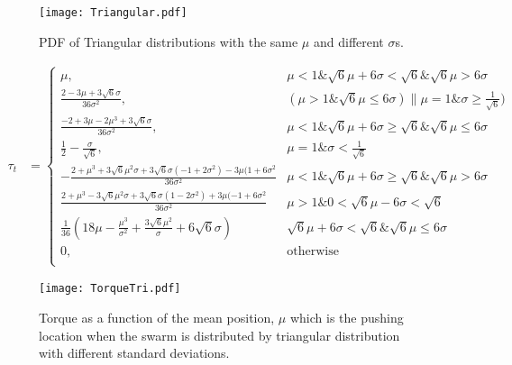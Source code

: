 \begin{figure}
\begin{center}
	\texttt{[image: Triangular.pdf]}
\end{center}
\vspace{-1em}
\caption{\label{fig:pdfTri}
PDF of Triangular distributions with the same $\mu$ and different $\sigma$s.
}
\vspace{-1em}
\end{figure}
\begin{align*}
\tau_t &=  \left\{
\begin{array}{ll}
    \mu, &  \mu<1 \& \sqrt{6} \mu + 6 \sigma < \sqrt{6} \& \sqrt{6} \mu > 6 \sigma\\
    \frac{2-3\mu+3\sqrt{6}\sigma}{36\sigma^2}, & (\mu>1\&\sqrt{6}\mu \leq 6\sigma) \| \mu =1 \& \sigma \geq \frac{1}{\sqrt{6}})\\
    \frac{-2+3\mu-2\mu^3+3\sqrt{6}\sigma}{36\sigma^2}, &  \mu<1 \& \sqrt{6}\mu+6\sigma\geq \sqrt{6} \& \sqrt{6} \mu \leq 6\sigma\\
    \frac{1}{2}-\frac{\sigma}{\sqrt{6}}, &   \mu = 1 \& \sigma < \frac{1}{\sqrt{6}}\\
    -\frac{2+\mu^3+3\sqrt{6}\mu^2\sigma+3\sqrt{6}\sigma(-1+2\sigma^2)-3\mu(1+6\sigma^2}{36\sigma^2} & \mu<1 \& \sqrt{6} \mu + 6 \sigma \geq \sqrt{6} \& \sqrt{6} \mu > 6 \sigma\\
    \frac{2+\mu^3-3\sqrt{6}\mu^2\sigma+3\sqrt{6}\sigma(1-2\sigma^2)+3\mu(-1+6\sigma^2}{36\sigma^2} & \mu>1 \& 0<\sqrt{6}\mu-6\sigma<\sqrt{6}\\
    \frac{1}{36}(18\mu-\frac{\mu^3}{\sigma^2} + \frac{3\sqrt{6}\mu^2}{\sigma}+6\sqrt{6}\sigma) &  \sqrt{6} \mu+6\sigma<\sqrt{6}\&\sqrt{6}\mu\leq 6\sigma\\
     0, & \textrm{otherwise}\\ 
\end{array} 
\right.
\end{align*}

\begin{figure}
\begin{center}
	\texttt{[image: TorqueTri.pdf]}
\end{center}
\vspace{-1em}
\caption{\label{fig:torqueTri}
Torque as a function of the mean position, $\mu$ which is the pushing location when the swarm is distributed by triangular distribution with different standard deviations.
}
\vspace{-1em}
\end{figure}


